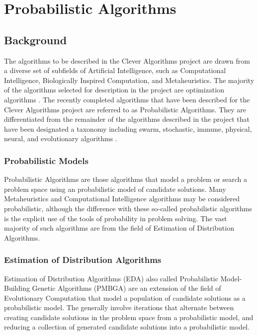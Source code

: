\documentclass[a4paper, 11pt]{article}
\begin{document}
% 
% 
\section{Probabilistic Algorithms}
\label{sec:algorithms}

% 
% 
\subsection{Background}
The algorithms to be described in the Clever Algorithms project are drawn from a diverse set of subfields of Artificial Intelligence, such as Computational Intelligence, Biologically Inspired Computation, and Metaheuristics. The majority of the algorithms selected for description in the project are optimization algorithms \cite{Brownlee2010b}. 
The recently completed algorithms that have been described for the Clever Algorithms project are referred to as Probabilistic Algorithms. They are differentiated from the remainder of the algorithms described in the project that have been designated a taxonomy including swarm, stochastic, immune, physical, neural, and evolutionary algorithms \cite{Brownlee2010b}. 

\subsubsection{Probabilistic Models}
Probabilistic Algorithms are those algorithms that model a problem or search a problem space using an probabilistic model of candidate solutions. Many Metaheuristics and Computational Intelligence algorithms may be considered probabilistic, although the difference with these so-called probabilistic algorithms is the explicit use of the tools of probability in problem solving. The vast majority of such algorithms are from the field of Estimation of Distribution Algorithms.

\subsubsection{Estimation of Distribution Algorithms}
Estimation of Distribution Algorithms (EDA) also called Probabilistic Model-Building Genetic Algorithms (PMBGA) are an extension of the field of Evolutionary Computation that model a population of candidate solutions as a probabilistic model. The generally involve iterations that alternate between creating candidate solutions in the problem space from a probabilistic model, and reducing a collection of generated candidate solutions into a probabilistic model. 
\end{document}
